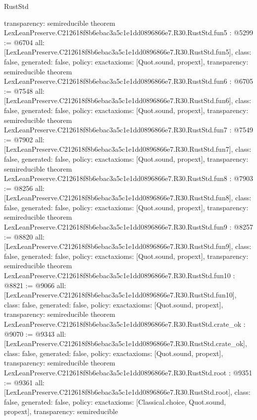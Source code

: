 \begin{lexlean}{RustStd}
\begin{coremodule}
{  transparency: semireducible
}
theorem LexLeanPreserve.C212618f8b6ebac3a5c1e1dd0896866e7.R30.RustStd.fun5 : @5299 := @6704 {
  all: [LexLeanPreserve.C212618f8b6ebac3a5c1e1dd0896866e7.R30.RustStd.fun5],
  class: false,
  generated: false,
  policy: exact{axioms: [Quot.sound, propext]},
  transparency: semireducible
}
theorem LexLeanPreserve.C212618f8b6ebac3a5c1e1dd0896866e7.R30.RustStd.fun6 : @6705 := @7548 {
  all: [LexLeanPreserve.C212618f8b6ebac3a5c1e1dd0896866e7.R30.RustStd.fun6],
  class: false,
  generated: false,
  policy: exact{axioms: [Quot.sound, propext]},
  transparency: semireducible
}
theorem LexLeanPreserve.C212618f8b6ebac3a5c1e1dd0896866e7.R30.RustStd.fun7 : @7549 := @7902 {
  all: [LexLeanPreserve.C212618f8b6ebac3a5c1e1dd0896866e7.R30.RustStd.fun7],
  class: false,
  generated: false,
  policy: exact{axioms: [Quot.sound, propext]},
  transparency: semireducible
}
theorem LexLeanPreserve.C212618f8b6ebac3a5c1e1dd0896866e7.R30.RustStd.fun8 : @7903 := @8256 {
  all: [LexLeanPreserve.C212618f8b6ebac3a5c1e1dd0896866e7.R30.RustStd.fun8],
  class: false,
  generated: false,
  policy: exact{axioms: [Quot.sound, propext]},
  transparency: semireducible
}
theorem LexLeanPreserve.C212618f8b6ebac3a5c1e1dd0896866e7.R30.RustStd.fun9 : @8257 := @8820 {
  all: [LexLeanPreserve.C212618f8b6ebac3a5c1e1dd0896866e7.R30.RustStd.fun9],
  class: false,
  generated: false,
  policy: exact{axioms: [Quot.sound, propext]},
  transparency: semireducible
}
theorem LexLeanPreserve.C212618f8b6ebac3a5c1e1dd0896866e7.R30.RustStd.fun10 : @8821 := @9066 {
  all: [LexLeanPreserve.C212618f8b6ebac3a5c1e1dd0896866e7.R30.RustStd.fun10],
  class: false,
  generated: false,
  policy: exact{axioms: [Quot.sound, propext]},
  transparency: semireducible
}
theorem LexLeanPreserve.C212618f8b6ebac3a5c1e1dd0896866e7.R30.RustStd.crate_ok : @9070 := @9343 {
  all: [LexLeanPreserve.C212618f8b6ebac3a5c1e1dd0896866e7.R30.RustStd.crate_ok],
  class: false,
  generated: false,
  policy: exact{axioms: [Quot.sound, propext]},
  transparency: semireducible
}
theorem LexLeanPreserve.C212618f8b6ebac3a5c1e1dd0896866e7.R30.RustStd.root : @9351 := @9361 {
  all: [LexLeanPreserve.C212618f8b6ebac3a5c1e1dd0896866e7.R30.RustStd.root],
  class: false,
  generated: false,
  policy: exact{axioms: [Classical.choice, Quot.sound, propext]},
  transparency: semireducible
}


\end{coremodule}
\end{lexlean}
